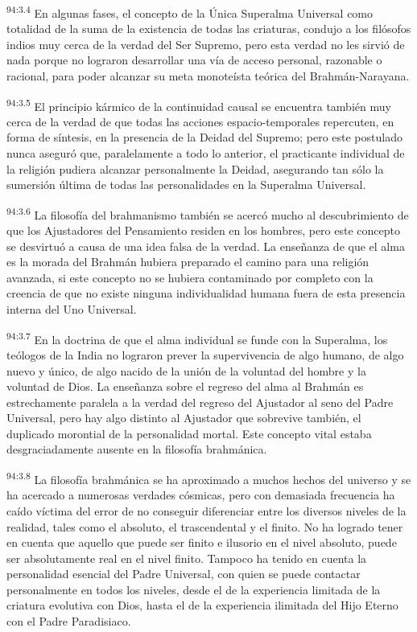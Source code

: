 \par
\textsuperscript{94:3.4} En algunas fases, el concepto de la Única Superalma Universal como totalidad de la suma de la existencia de todas las criaturas, condujo a los filósofos indios muy cerca de la verdad del Ser Supremo, pero esta verdad no les sirvió de nada porque no lograron desarrollar una vía de acceso personal, razonable o racional, para poder alcanzar su meta monoteísta teórica del Brahmán-Narayana.

\par
\textsuperscript{94:3.5} El principio kármico de la continuidad causal se encuentra también muy cerca de la verdad de que todas las acciones espacio-temporales repercuten, en forma de síntesis, en la presencia de la Deidad del Supremo; pero este postulado nunca aseguró que, paralelamente a todo lo anterior, el practicante individual de la religión pudiera alcanzar personalmente la Deidad, asegurando tan sólo la sumersión última de todas las personalidades en la Superalma Universal.

\par
\textsuperscript{94:3.6} La filosofía del brahmanismo también se acercó mucho al descubrimiento de que los Ajustadores del Pensamiento residen en los hombres, pero este concepto se desvirtuó a causa de una idea falsa de la verdad. La enseñanza de que el alma es la morada del Brahmán hubiera preparado el camino para una religión avanzada, si este concepto no se hubiera contaminado por completo con la creencia de que no existe ninguna individualidad humana fuera de esta presencia interna del Uno Universal.

\par
\textsuperscript{94:3.7} En la doctrina de que el alma individual se funde con la Superalma, los teólogos de la India no lograron prever la supervivencia de algo humano, de algo nuevo y único, de algo nacido de la unión de la voluntad del hombre y la voluntad de Dios. La enseñanza sobre el regreso del alma al Brahmán es estrechamente paralela a la verdad del regreso del Ajustador al seno del Padre Universal, pero hay algo distinto al Ajustador que sobrevive también, el duplicado morontial de la personalidad mortal. Este concepto vital estaba desgraciadamente ausente en la filosofía brahmánica.

\par
\textsuperscript{94:3.8} La filosofía brahmánica se ha aproximado a muchos hechos del universo y se ha acercado a numerosas verdades cósmicas, pero con demasiada frecuencia ha caído víctima del error de no conseguir diferenciar entre los diversos niveles de la realidad, tales como el absoluto, el trascendental y el finito. No ha logrado tener en cuenta que aquello que puede ser finito e ilusorio en el nivel absoluto, puede ser absolutamente real en el nivel finito. Tampoco ha tenido en cuenta la personalidad esencial del Padre Universal, con quien se puede contactar personalmente en todos los niveles, desde el de la experiencia limitada de la criatura evolutiva con Dios, hasta el de la experiencia ilimitada del Hijo Eterno con el Padre Paradisiaco.

